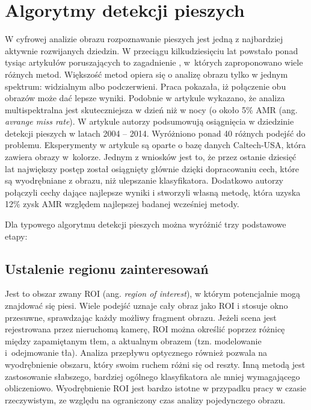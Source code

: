 \chapter{Algorytmy detekcji pieszych}

W cyfrowej analizie obrazu rozpoznawanie pieszych jest jedną z najbardziej aktywnie rozwijanych dziedzin. 
W przeciągu kilkudziesięciu lat powstało ponad tysiąc artykułów poruszających to zagadnienie \cite{zhang2015filtered}, w~których zaproponowano wiele różnych metod. 
Większość metod opiera się o analizę obrazu tylko w jednym spektrum: widzialnym albo podczerwieni. 
Praca \cite{hwang2015multispectral} pokazała, iż połączenie obu obrazów może dać lepsze wyniki. 
Podobnie w artykule \cite{gonzalez2016pedestrian} wykazano, że analiza multispektralna jest skuteczniejsza w dzień niż w nocy (o około 5\% AMR (ang. \textit{avrange miss rate}). 
W artykule \cite{benenson2014ten} autorzy podsumowują osiągnięcia w dziedzinie detekcji pieszych w latach 2004 -- 2014. 
Wyróżniono ponad 40 różnych podejść do problemu. 
Eksperymenty w artykule są oparte o bazę danych Caltech-USA, która zawiera obrazy w~kolorze. 
Jednym z wniosków jest to, że przez ostanie dziesięć lat największy postęp został osiągnięty głównie dzięki dopracowaniu cech, które są wyodrębniane z obrazu, niż ulepszanie klasyfikatora. 
Dodatkowo autorzy połączyli cechy dające najlepsze wyniki i stworzyli własną metodę, która uzyska 12\% zysk AMR względem najlepszej badanej wcześniej metody.


Dla typowego algorytmu detekcji pieszych można wyróżnić trzy podstawowe etapy:

\section{Ustalenie regionu zainteresowań} 

Jest to obszar zwany ROI (ang. \textit{region of interest}), w którym potencjalnie mogą znajdować się piesi. 
Wiele podejść uznaje cały obraz jako ROI i stosuje okno przesuwne, sprawdzając każdy możliwy fragment obrazu. 
Jeżeli scena jest rejestrowana przez nieruchomą kamerę, ROI można określić poprzez różnicę między zapamiętanym tłem, a aktualnym obrazem (tzn. modelowanie i~odejmowanie tła). Analiza przepływu optycznego również pozwala na wyodrębnienie obszaru, który swoim ruchem różni się od reszty. Inną metodą jest zastosowanie słabszego, bardziej ogólnego klasyfikatora ale mniej wymagającego obliczeniowo.
Wyodrębnienie ROI jest bardzo istotne w przypadku pracy w czasie rzeczywistym, ze względu na ograniczony czas analizy pojedynczego obrazu.

